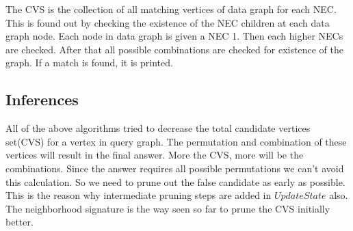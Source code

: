 \hspace{10mm} The CVS is the collection of all matching vertices of data graph for each NEC. This is found out by checking the existence of the NEC children at each data graph node. Each node in data graph is given a NEC 1. Then each higher NECs are checked. After that all possible combinations are checked for existence of the graph. If a match is found, it is printed.


\subsection{Inferences}
\label{sec:findings}
	\hspace{10mm}All of the above algorithms tried to decrease the total candidate vertices set(CVS) for a vertex in query graph. The permutation and combination of these vertices will result in the final answer. More the CVS, more will be the combinations. Since the answer requires all possible permutations we can't avoid this calculation. So we need to prune out the false candidate as early as possible. This is the reason why intermediate pruning steps are added in $UpdateState$ also. The neighborhood signature is the way seen so far to prune the CVS initially better.

